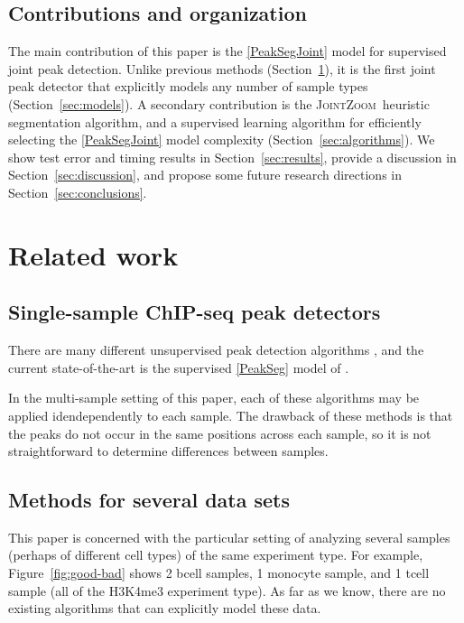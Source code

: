 \documentclass{article} %
\newcommand{\JointHeuristic}{\textsc{JointZoom}}
\begin{document}
\subsection{Contributions and organization}

The main contribution of this paper is the \ref{PeakSegJoint} model
for supervised joint peak detection. Unlike previous methods
(Section~\ref{sec:related}), it is the first joint peak detector that
explicitly models any number of sample types
(Section~\ref{sec:models}). A secondary contribution is the
\JointHeuristic\ heuristic segmentation algorithm, and a supervised
learning algorithm for efficiently selecting the \ref{PeakSegJoint}
model complexity (Section~\ref{sec:algorithms}).  We show test error
and timing results in Section~\ref{sec:results}, provide a discussion
in Section~\ref{sec:discussion}, and propose some future research
directions in Section~\ref{sec:conclusions}.

\section{Related work}
\label{sec:related}

\subsection{Single-sample ChIP-seq peak detectors}

There are many different unsupervised peak detection algorithms
\citep{evaluation2010, rye2010manually, chip-seq-bench}, and the
current state-of-the-art is the supervised \ref{PeakSeg} model of
\citet{HOCKING-PeakSeg}. 

In the multi-sample setting of this paper, each of these algorithms
may be applied idendependently to each sample. The drawback of these
methods is that the peaks do not occur in the same positions across
each sample, so it is not straightforward to determine differences
between samples.

\subsection{Methods for several data sets}

This paper is concerned with the particular setting of analyzing
several samples (perhaps of different cell types) of the same
experiment type. For example, Figure~\ref{fig:good-bad} shows 2 bcell
samples, 1 monocyte sample, and 1 tcell sample (all of the H3K4me3
experiment type). As far as we know, there are no existing algorithms
that can explicitly model these data.
\end{document}
